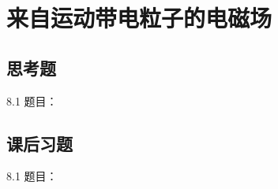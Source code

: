\chapter{来自运动带电粒子的电磁场}

\section{思考题}

\begin{thinking}{8.1}
  题目：\todoanswer

  \begin{solution}
    \todoanswer
  \end{solution}
\end{thinking}

\section{课后习题}

\begin{exercise}{8.1}
  题目：\todoanswer

  \begin{solution}
    \todoanswer
  \end{solution}
\end{exercise}
